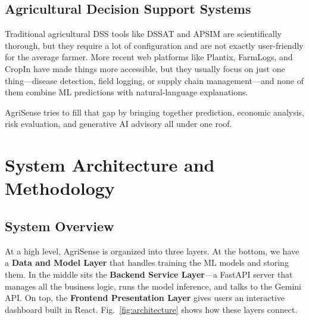 \documentclass[conference]{IEEEtran}
\begin{document}
\subsection{Agricultural Decision Support Systems}
Traditional agricultural DSS tools like DSSAT \cite{jones2003} and APSIM \cite{holzworth2014} are scientifically thorough, but they require a lot of configuration and are not exactly user-friendly for the average farmer. More recent web platforms like Plantix, FarmLogs, and CropIn have made things more accessible, but they usually focus on just one thing---disease detection, field logging, or supply chain management---and none of them combine ML predictions with natural-language explanations.

AgriSense tries to fill that gap by bringing together prediction, economic analysis, risk evaluation, and generative AI advisory all under one roof.

\section{System Architecture and Methodology}
\label{sec:methodology}

\subsection{System Overview}
At a high level, AgriSense is organized into three layers. At the bottom, we have a \textbf{Data and Model Layer} that handles training the ML models and storing them. In the middle sits the \textbf{Backend Service Layer}---a FastAPI server that manages all the business logic, runs the model inference, and talks to the Gemini API. On top, the \textbf{Frontend Presentation Layer} gives users an interactive dashboard built in React. Fig.~\ref{fig:architecture} shows how these layers connect.
\end{document}
